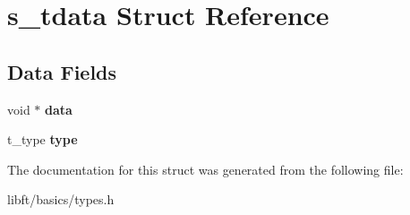 \hypertarget{structs__tdata}{}\section{s\+\_\+tdata Struct Reference}
\label{structs__tdata}
\subsection*{Data Fields}
\begin{DoxyCompactItemize}
\item 
\hypertarget{structs__tdata_a735984d41155bc1032e09bece8f8d66d}{}void $\ast$ {\bfseries data}\label{structs__tdata_a735984d41155bc1032e09bece8f8d66d}

\item 
\hypertarget{structs__tdata_aab17f2f3d2a1849cc867d31899d451c8}{}t\+\_\+type {\bfseries type}\label{structs__tdata_aab17f2f3d2a1849cc867d31899d451c8}

\end{DoxyCompactItemize}


The documentation for this struct was generated from the following file\+:\begin{DoxyCompactItemize}
\item 
libft/basics/types.\+h\end{DoxyCompactItemize}
